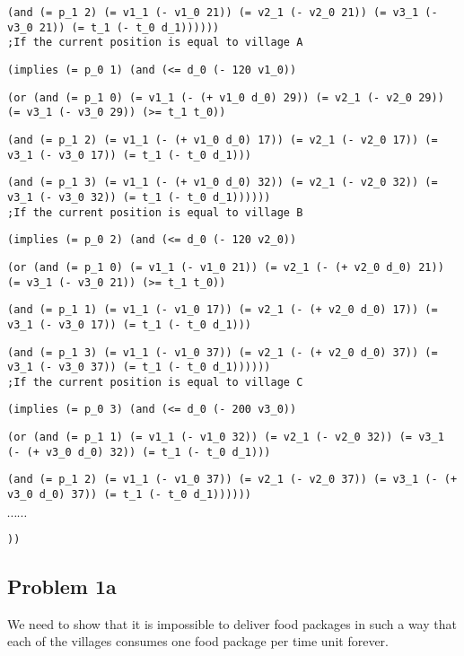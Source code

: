 \documentclass[a4paper]{article}
\begin{document}
{{\tt              (and (= p\_1 2) (= v1\_1 (- v1\_0 21)) (= v2\_1 (- v2\_0 21)) (= v3\_1 (- v3\_0 21)) (= t\_1 (- t\_0 d\_1)))))) }\\

{\tt ;If the current position is equal to village A }

{\tt (implies (= p\_0 1) (and (<= d\_0 (- 120 v1\_0)) }

{\tt          (or (and (= p\_1 0) (= v1\_1 (- (+ v1\_0 d\_0) 29)) (= v2\_1 (- v2\_0 29)) (= v3\_1 (- v3\_0 29)) (>= t\_1 t\_0)) }

{\tt              (and (= p\_1 2) (= v1\_1 (- (+ v1\_0 d\_0) 17)) (= v2\_1 (- v2\_0 17)) (= v3\_1 (- v3\_0 17)) (= t\_1 (- t\_0 d\_1))) }

{\tt              (and (= p\_1 3) (= v1\_1 (- (+ v1\_0 d\_0) 32)) (= v2\_1 (- v2\_0 32)) (= v3\_1 (- v3\_0 32)) (= t\_1 (- t\_0 d\_1)))))) }\\

{\tt ;If the current position is equal to village B }

{\tt (implies (= p\_0 2) (and (<= d\_0 (- 120 v2\_0)) }

{\tt          (or (and (= p\_1 0) (= v1\_1 (- v1\_0 21)) (= v2\_1 (- (+ v2\_0 d\_0) 21)) (= v3\_1 (- v3\_0 21)) (>= t\_1 t\_0)) }

{\tt              (and (= p\_1 1) (= v1\_1 (- v1\_0 17)) (= v2\_1 (- (+ v2\_0 d\_0) 17)) (= v3\_1 (- v3\_0 17)) (= t\_1 (- t\_0 d\_1))) }

{\tt              (and (= p\_1 3) (= v1\_1 (- v1\_0 37)) (= v2\_1 (- (+ v2\_0 d\_0) 37)) (= v3\_1 (- v3\_0 37)) (= t\_1 (- t\_0 d\_1)))))) }\\

{\tt ;If the current position is equal to village C }

{\tt (implies (= p\_0 3) (and (<= d\_0 (- 200 v3\_0)) }

{\tt          (or (and (= p\_1 1) (= v1\_1 (- v1\_0 32)) (= v2\_1 (- v2\_0 32)) (= v3\_1 (- (+ v3\_0 d\_0) 32)) (= t\_1 (- t\_0 d\_1))) }

{\tt              (and (= p\_1 2) (= v1\_1 (- v1\_0 37)) (= v2\_1 (- v2\_0 37)) (= v3\_1 (- (+ v3\_0 d\_0) 37)) (= t\_1 (- t\_0 d\_1)))))) }

$\cdots \cdots$

{\tt )) }
}

	\subsection*{Problem 1a}
	We need to show that it is impossible to deliver food packages in such a way that each of the villages consumes one food package per time unit forever.
	
\end{document}
